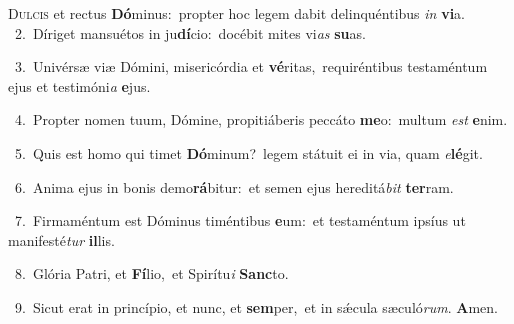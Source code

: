 \lettrine{\initial\textcolor{\initialcolor}{D}}{ulcis} et rectus \textbf{Dó}\-minus:~\star propter hoc legem dabit delinquéntibus \textit{in} \textbf{vi}\-a.\\
{\numbfont\textcolor{\numbcolor}{~2.}}~Díriget mansuétos in ju\-\textbf{dí}\-cio:~\star docébit mites vi\textit{as} \textbf{su}\-as.\par
{\numbfont\textcolor{\numbcolor}{~3.}}~Univérsæ viæ Dómini, misericórdia et \textbf{vé}\-ritas,~\star requiréntibus testaméntum ejus et testimóni\textit{a} \textbf{e}\-jus.\par
{\numbfont\textcolor{\numbcolor}{~4.}}~Propter nomen tuum, Dómine, propitiáberis peccáto \textbf{me}\-o:~\star multum \textit{est} \textbf{e}\-nim.\par
{\numbfont\textcolor{\numbcolor}{~5.}}~Quis est homo qui timet \textbf{Dó}\-minum?~\star legem státuit ei in via, quam \textit{e}\-\textbf{lé}git.\par
{\numbfont\textcolor{\numbcolor}{~6.}}~Anima ejus in bonis demo\-\textbf{rá}\-bitur:~\star et semen ejus hereditá\textit{bit} \textbf{ter}\-ram.\par
{\numbfont\textcolor{\numbcolor}{~7.}}~Firmaméntum est Dóminus timéntibus \textbf{e}\-um:~\star et testaméntum ipsíus ut manifesté\textit{tur} \textbf{il}\-lis.\par
{\numbfont\textcolor{\numbcolor}{~8.}}~Glória Patri, et \textbf{Fí}\-lio,~\star et Spirítu\textit{i} \textbf{Sanc}\-to.\par
{\numbfont\textcolor{\numbcolor}{~9.}}~Sicut erat in princípio, et nunc, et \textbf{sem}\-per,~\star et in sǽcula sæculó\-\textit{rum}\-. \textbf{A}\-men.\par
